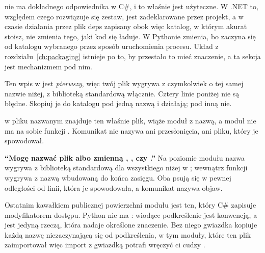 \begin{csbox}
 nie ma dokładnego odpowiednika w C\#, i to właśnie jest użyteczne.
W .NET to, względem czego rozwiązuje się zestaw, jest zadeklarowane \dash{}
przez projekt, a w czasie działania przez plik deps zapisany obok \dash{}
więc katalog, w którym akurat stoisz, nie zmienia tego, jaki kod się
ładuje. W Pythonie zmienia, bo  zaczyna się od katalogu
wybranego przez sposób uruchomienia procesu. Układ  z
rozdziału~\ref{ch:packaging} istnieje po to, by przestało to mieć
znaczenie, a ta sekcja jest mechanizmem pod nim.
\end{csbox}

\noindent
Ten wpis w  jest \emph{pierwszy}, więc twój plik wygrywa z
czymkolwiek o tej samej nazwie niżej, z biblioteką standardową włącznie.
Cztery linie poniżej nie są błędne. Skopiuj je do katalogu pod jedną nazwą i
działają; pod inną nie.




\noindent
{} w pliku nazwanym  znajduje ten właśnie
plik, wiąże moduł z nazwą, a moduł nie ma na sobie funkcji .
Komunikat nie nazywa ani przesłonięcia, ani pliku, który je spowodował.

\begin{trapbox}
\textbf{\enquote{Mogę nazwać plik albo zmienną , ,
 czy .}} Na poziomie modułu nazwa wygrywa z
biblioteką standardową dla wszystkiego niżej w ; wewnątrz
funkcji wygrywa z nazwą wbudowaną do końca zasięgu. Oba psują się w pewnej
odległości od linii, która je spowodowała, a komunikat nazywa objaw.
\end{trapbox}

\noindent
Ostatnim kawałkiem publicznej powierzchni modułu jest ten, który C\# zapisuje
modyfikatorem dostępu. Python nie ma : wiodące podkreślenie
jest konwencją, a  jest jedyną rzeczą, która nadaje
 określone znaczenie. Bez niego gwiazdka kopiuje
każdą nazwę niezaczynającą się od podkreślenia, w tym moduły, które ten plik
zaimportował \dash{} więc import z gwiazdką potrafi wręczyć ci cudzy
.


